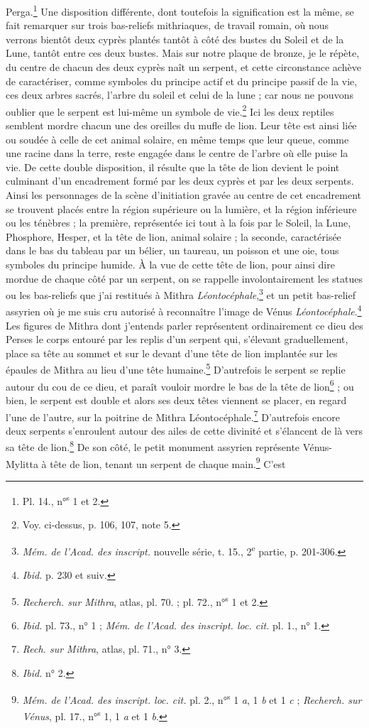 \documentclass{article}
\begin{document}
Perga.\footnote{Pl. 14., n°\textsuperscript{s} 1 et 2.} Une disposition différente, dont toutefois la signification est la même, se fait remarquer sur trois bas-reliefs mithriaques, de travail romain, où nous verrons bientôt deux cyprès plantés tantôt à côté des bustes du Soleil et de la Lune, tantôt entre ces deux bustes. Mais sur notre plaque de bronze, je le répète, du centre de chacun des deux cyprès naît un serpent, et cette circonstance achève de caractériser, comme symboles du principe actif et du principe passif de la vie, ces deux arbres sacrés, l'arbre du soleil et celui de la lune ; car nous ne pouvons oublier que le serpent est lui-même un symbole de vie.\footnote{Voy. ci-dessus, p. 106, 107, note 5.} Ici les deux reptiles semblent mordre chacun une des oreilles du mufle de lion. Leur tête est ainsi liée ou soudée à celle de cet animal solaire, en même temps que leur queue, comme une racine dans la terre, reste engagée dans le centre de l'arbre où elle puise la vie. De cette double disposition, il résulte que la tête de lion devient le point culminant d'un encadrement formé par les deux cyprès et par les deux serpents. Ainsi les personnages de la scène d'initiation gravée au centre de cet encadrement se trouvent placés entre la région supérieure ou la lumière, et la région inférieure ou les ténèbres ; la première, représentée ici tout à la fois par le Soleil, la Lune, Phosphore, Hesper, et la tête de lion, animal solaire ; la seconde, caractérisée dans le bas du tableau par un bélier, un taureau, un poisson et une oie, tous symboles du principe humide. À la vue de cette tête de lion, pour ainsi dire mordue de chaque côté par un serpent, on se rappelle involontairement les statues ou les bas-reliefs que j'ai restitués à Mithra \emph{Léontocéphale},\footnote{\emph{Mém. de l'Acad. des inscript.} nouvelle série, t. 15., 2\textsuperscript{e} partie, p. 201-306.} et un petit bas-relief assyrien où je me suis cru autorisé à reconnaître l'image de Vénus \emph{Léontocéphale}.\footnote{\emph{Ibid.} p. 230 et suiv.} Les figures de Mithra dont j'entends parler représentent ordinairement ce dieu des Perses le corps entouré par les replis d'un serpent qui, s'élevant graduellement, place sa tête au sommet et sur le devant d'une tête de lion implantée sur les épaules de Mithra au lieu d'une tête humaine.\footnote{\emph{Recherch. sur Mithra}, atlas, pl. 70. ; pl. 72., n°\textsuperscript{s} 1 et 2.} D'autrefois le serpent se replie autour du cou de ce dieu, et paraît vouloir mordre le bas de la tête de lion\footnote{\emph{Ibid.} pl. 73., n° 1 ; \emph{Mém. de l'Acad. des inscript. loc. cit.} pl. 1., n° 1.} ; ou bien, le serpent est double et alors ses deux têtes viennent se placer, en regard l'une de l'autre, sur la poitrine de Mithra Léontocéphale.\footnote{\emph{Rech. sur Mithra}, atlas, pl. 71., n° 3.} D'autrefois encore deux serpents s'enroulent autour des ailes de cette divinité et s'élancent de là vers sa tête de lion.\footnote{\emph{Ibid.} n° 2.} De son côté, le petit monument assyrien représente Vénus-Mylitta à tête de lion, tenant un serpent de chaque main.\footnote{\emph{Mém. de l'Acad. des inscript. loc. cit.} pl. 2., n°\textsuperscript{s} 1 \emph{a}, 1 \emph{b} et 1 \emph{c} ; \emph{Recherch. sur Vénus}, pl. 17., n°\textsuperscript{s} 1, 1 \emph{a} et 1 \emph{b}.} C'est 
\end{document}
